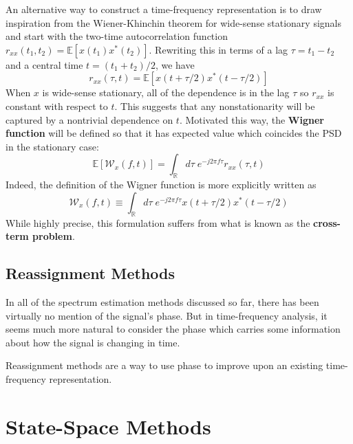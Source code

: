 \documentclass[twocolumn]{gwclass}
\newcommand{\R}{\mathbb{R}}
\begin{document}
An alternative way to construct a time-frequency representation is to draw inspiration from the Wiener-Khinchin theorem for wide-sense stationary signals and start with the two-time autocorrelation function $r_{xx}(t_1,t_2)=\mathbb{E}[x(t_1)x^*(t_2)]$. Rewriting this in terms of a lag $\tau=t_1-t_2$ and a central time $t=(t_1+t_2)/2$, we have
$$ r_{xx}(\tau,t)=\mathbb{E}[x(t + \tau/2)x^*(t-\tau/2)] $$
When $x$ is wide-sense stationary, all of the dependence is in the lag $\tau$ so $r_{xx}$ is constant with respect to $t$. This suggests that any nonstationarity will be captured by a nontrivial dependence on $t$. Motivated this way, the \textbf{Wigner function} will be defined so that it has expected value which coincides the PSD in the stationary case:
$$ \mathbb{E}[\mathcal{W}_x(f,t)] = \int_\R d\tau\;e^{-j2\pi f\tau}r_{xx}(\tau,t) $$
Indeed, the definition of the Wigner function is more explicitly written as
$$ \mathcal{W}_x(f,t) \equiv \int_\R d\tau\;e^{-j2\pi f\tau}x(t+\tau/2)x^*(t-\tau/2) $$
While highly precise, this formulation suffers from what is known as the \textbf{cross-term problem}.

\subsection{Reassignment Methods}

In all of the spectrum estimation methods discussed so far, there has been virtually no mention of the signal's phase. But in time-frequency analysis, it seems much more natural to consider the phase which carries some information about how the signal is changing in time. 

Reassignment methods are a way to use phase to improve upon an existing time-frequency representation.

\section{State-Space Methods}
\end{document}
